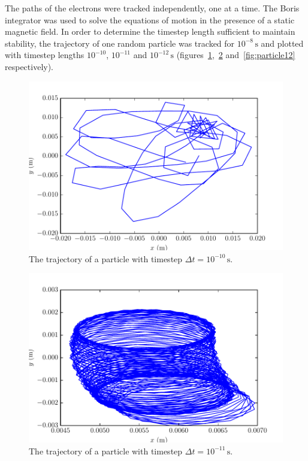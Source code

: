 \documentclass[12pt, a4paper]{article}
\begin{document}
The paths of the electrons were tracked independently, one at a time. The Boris integrator was used to solve the equations of motion in the presence of a static magnetic field. In order to determine the timestep length sufficient to maintain stability, the trajectory of one random particle was tracked for $10^{-8}\,\si{\second}$ and plotted with timestep lengths $10^{-10}$, $10^{-11}$ and $10^{-12}\,\si{\second}$ (figures~\ref{fig:particle10},~\ref{fig:particle11} and~\ref{fig:particle12} respectively).
\begin{figure}[t]
    \centering
    \includegraphics{output/particle_trajectory_10.pdf}
    \caption{The trajectory of a particle with timestep $\Delta t = 10^{-10}\,\si{\second}$.}
    \label{fig:particle10}
\end{figure}
\begin{figure}[t]
    \centering
    \includegraphics{output/particle_trajectory_11.pdf}
    \caption{The trajectory of a particle with timestep $\Delta t = 10^{-11}\,\si{\second}$.}
    \label{fig:particle11}
\end{figure}
\end{document}
